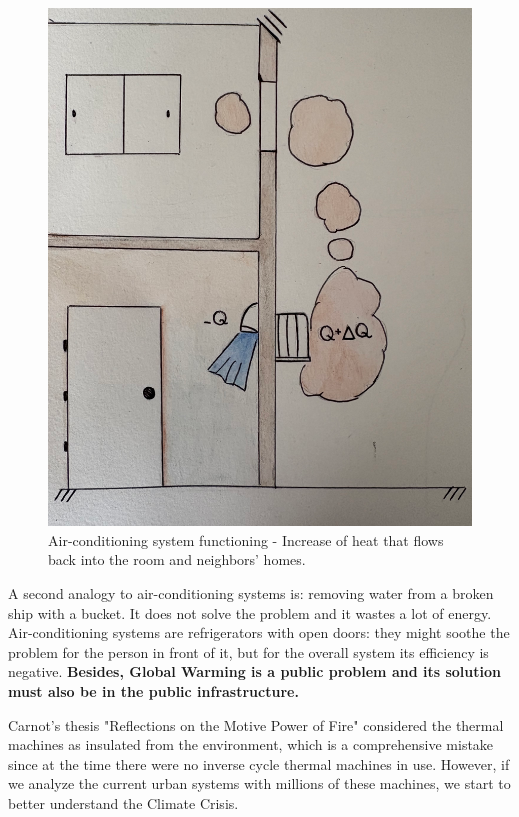 \begin{figure}[ht]
    \centering
    \includegraphics[scale=0.35]{pictures/predio.png}
    \caption{Air-conditioning system functioning - Increase of heat that flows back into the room and neighbors' homes.}
    \label{predios}
\end{figure}

A second analogy to air-conditioning systems is: removing water from a broken ship with a bucket. It does not solve the problem and it wastes a lot of energy. Air-conditioning systems are refrigerators with open doors: they might soothe the problem for the person in front of it, but for the overall system its efficiency is negative. \textbf{Besides, Global Warming is a public problem and its solution must also be in the public infrastructure. }
                                                                           
Carnot's thesis "Reflections on the Motive Power of Fire" considered the thermal machines as insulated from the environment, which is a comprehensive mistake since at the time there were no inverse cycle thermal machines in use. However, if we analyze the current urban systems with millions of these machines, we start to better understand the Climate Crisis.

